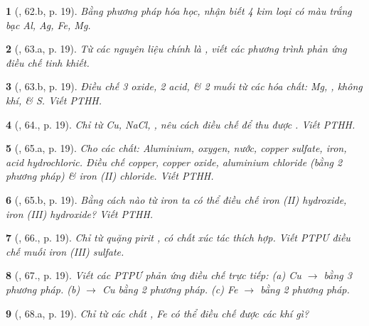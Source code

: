 \documentclass{article}
\newtheorem{baitoan}{}
\begin{document}
\begin{baitoan}[\cite{An_400_BT_Hoa_Hoc_9}, 62.b, p. 19]
	Bằng phương pháp hóa học, nhận biết 4 kim loại có màu trắng bạc {\rm Al, Ag, Fe, Mg}.
\end{baitoan}

\begin{baitoan}[\cite{An_400_BT_Hoa_Hoc_9}, 63.a, p. 19]
	Từ các nguyên liệu chính là {\rm{}}, viết các phương trình phản ứng điều chế {\rm{}} tinh khiết.
\end{baitoan}

\begin{baitoan}[\cite{An_400_BT_Hoa_Hoc_9}, 63.b, p. 19]
	Điều chế 3 oxide, 2 acid, \& 2 muối từ các hóa chất: {\rm Mg, }, không khí, \& {\rm S}. Viết {\rm PTHH}.
\end{baitoan}

\begin{baitoan}[\cite{An_400_BT_Hoa_Hoc_9}, 64., p. 19]
	Chỉ từ {\rm Cu, NaCl, }, nêu cách điều chế để thu được {\rm{}}. Viết {\rm PTHH}.
\end{baitoan}

\begin{baitoan}[\cite{An_400_BT_Hoa_Hoc_9}, 65.a, p. 19]
	Cho các chất: Aluminium, oxygen, nước, copper sulfate, iron, acid hydrochloric. Điều chế copper, copper oxide, aluminium chloride (bằng 2 phương pháp) \& iron (II) chloride. Viết {\rm PTHH}.
\end{baitoan}

\begin{baitoan}[\cite{An_400_BT_Hoa_Hoc_9}, 65.b, p. 19]
	Bằng cách nào từ iron ta có thể điều chế iron (II) hydroxide, iron (III) hydroxide? Viết {\rm PTHH}.
\end{baitoan}

\begin{baitoan}[\cite{An_400_BT_Hoa_Hoc_9}, 66., p. 19]
	Chỉ từ quặng pirit {\rm{}}, có chất xúc tác thích hợp. Viết {\rm PTPƯ} điều chế muối iron (III) sulfate.
\end{baitoan}

\begin{baitoan}[\cite{An_400_BT_Hoa_Hoc_9}, 67., p. 19]
	Viết các {\rm PTPƯ} phản ứng điều chế trực tiếp: (a) {\rm Cu $\to$  bằng 3 phương pháp}. (b) {\rm{} $\to$ Cu} bằng 2 phương pháp. (c) {\rm Fe $\to$ } bằng 2 phương pháp.
\end{baitoan}

\begin{baitoan}[\cite{An_400_BT_Hoa_Hoc_9}, 68.a, p. 19]
	Chỉ từ các chất {\rm{}, Fe} có thể điều chế được các khí gì?
\end{baitoan}
\end{document}
